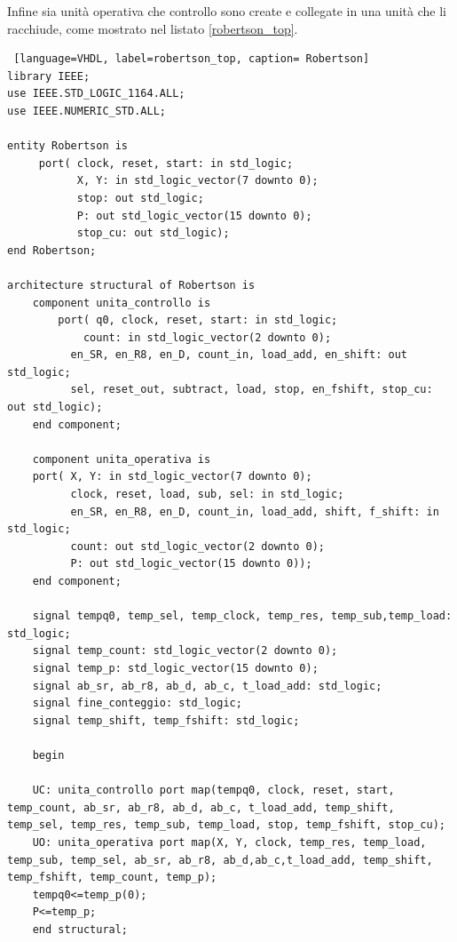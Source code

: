 Infine sia unità operativa che controllo sono create e collegate in una unità che li racchiude, come mostrato nel listato \ref{robertson_top}.
\begin{lstlisting} [language=VHDL, label=robertson_top, caption= Robertson]
library IEEE;
use IEEE.STD_LOGIC_1164.ALL;
use IEEE.NUMERIC_STD.ALL;

entity Robertson is
	 port( clock, reset, start: in std_logic;
		   X, Y: in std_logic_vector(7 downto 0);		   
		   stop: out std_logic;		   
		   P: out std_logic_vector(15 downto 0);
		   stop_cu: out std_logic);
end Robertson;

architecture structural of Robertson is
	component unita_controllo is 
		port( q0, clock, reset, start: in std_logic;
			count: in std_logic_vector(2 downto 0);
		  en_SR, en_R8, en_D, count_in, load_add, en_shift: out std_logic;
		  sel, reset_out, subtract, load, stop, en_fshift, stop_cu: out std_logic);
	end component;
	
	component unita_operativa is
	port( X, Y: in std_logic_vector(7 downto 0);
		  clock, reset, load, sub, sel: in std_logic;
		  en_SR, en_R8, en_D, count_in, load_add, shift, f_shift: in std_logic;
		  count: out std_logic_vector(2 downto 0);
		  P: out std_logic_vector(15 downto 0));
	end component;
	
	signal tempq0, temp_sel, temp_clock, temp_res, temp_sub,temp_load: std_logic;
	signal temp_count: std_logic_vector(2 downto 0);
	signal temp_p: std_logic_vector(15 downto 0);
	signal ab_sr, ab_r8, ab_d, ab_c, t_load_add: std_logic;
	signal fine_conteggio: std_logic;
	signal temp_shift, temp_fshift: std_logic;
	
	begin
	
	UC: unita_controllo port map(tempq0, clock, reset, start, temp_count, ab_sr, ab_r8, ab_d, ab_c, t_load_add, temp_shift, temp_sel, temp_res, temp_sub, temp_load, stop, temp_fshift, stop_cu);
	UO: unita_operativa port map(X, Y, clock, temp_res, temp_load, temp_sub, temp_sel, ab_sr, ab_r8, ab_d,ab_c,t_load_add, temp_shift, temp_fshift, temp_count, temp_p); 
	tempq0<=temp_p(0);
	P<=temp_p;
	end structural;
\end{lstlisting}


